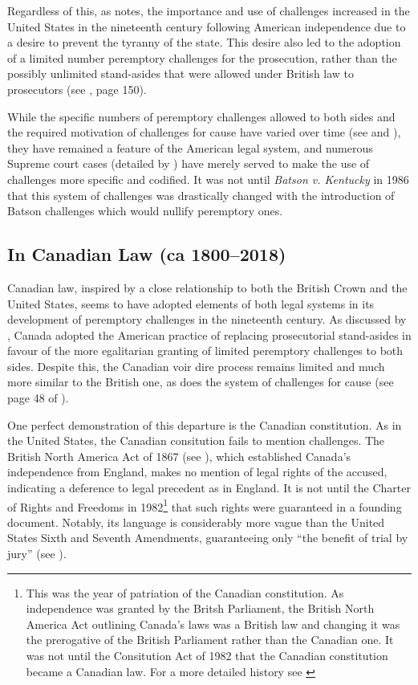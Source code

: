 Regardless of this, as \cite{brown2000} notes, the importance and use of challenges increased in the United States in the
nineteenth century following American independence due to a desire to prevent the tyranny of the state. This desire also led to
the adoption of a limited number peremptory challenges for the prosecution, rather than the possibly unlimited stand-asides that
were allowed under British law to prosecutors (see \cite{vandykejurysel}, page 150).

While the specific numbers of peremptory challenges allowed to both sides and the required motivation of challenges for cause have
varied over time (see \cite{hoffman1997} and \cite{brown2000}), they have remained a feature of the American legal system, and
numerous Supreme court cases (detailed by \cite{hoffman1997}) have merely served to make the use of challenges more specific and
codified. It was not until \textit{Batson v. Kentucky} in 1986 that this system of challenges was drastically changed with the
introduction of Batson challenges which would nullify peremptory ones.

\subsection{In Canadian Law (ca 1800--2018)}

Canadian law, inspired by a close relationship to both the British Crown and the United States, seems to have adopted elements of
both legal systems in its development of peremptory challenges in the nineteenth century. As discussed by \cite{brown2000}, Canada
adopted the American practice of replacing prosecutorial stand-asides in favour of the more egalitarian granting of limited
peremptory challenges to both sides. Despite this, the Canadian voir dire process remains limited and much more similar to the
British one, as does the system of challenges for cause (see page 48 of \cite{hansvidjudging}).

One perfect demonstration of this departure is the Canadian constitution. As in the United States, the Canadian consitution fails
to mention challenges. The British North America Act of 1867 (see \cite{canadaconst}), which established Canada's independence from
England, makes no mention of legal rights of the accused, indicating a deference to legal precedent as in England. It is not until
the Charter of Rights and Freedoms in 1982\footnote{This was the year of patriation of the Canadian constitution. As
  independence was granted by the Britsh Parliament, the British North America Act outlining Canada's laws was a British law and
  changing it was the prerogative of the British Parliament rather than the Canadian one. It was not until the Consitution Act of
  1982 that the Canadian constitution became a Canadian law. For a more detailed history see \cite{sheppard2018}} that such rights
were guaranteed in a founding document. Notably, its language is considerably more vague than the United States Sixth and Seventh
Amendments, guaranteeing only ``the benefit of trial by jury'' (see \cite{canadaconst}).

